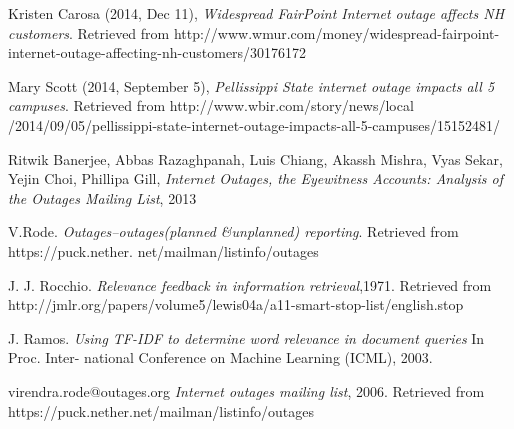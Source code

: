 \documentclass{sig-alternate}
\begin{document}
\begin{thebibliography}{7}
Kristen Carosa (2014, Dec 11),
  \emph{Widespread FairPoint Internet outage affects NH customers}. Retrieved from http://www.wmur.com/money/widespread-fairpoint-internet-outage-affecting-nh-customers/30176172

Mary Scott (2014, September 5),
  \emph{Pellissippi State internet outage impacts all 5 campuses}.
Retrieved from http://www.wbir.com/story/news/local
\newline /2014/09/05/pellissippi-state-internet-outage-impacts-all-5-campuses/15152481/
  
Ritwik Banerjee, Abbas Razaghpanah, Luis Chiang, Akassh Mishra, Vyas Sekar, Yejin Choi, Phillipa Gill,
  \emph{Internet Outages, the Eyewitness Accounts: Analysis of the Outages Mailing List}, 2013
  
V.Rode.
\emph{Outages–outages(planned &unplanned) reporting}. 
Retrieved from https://puck.nether. net/mailman/listinfo/outages

  J. J. Rocchio.
  \emph{Relevance feedback in information retrieval},1971. Retrieved from http://jmlr.org/papers/volume5/lewis04a/a11-smart-stop-list/english.stop

  J. Ramos.
  \emph{Using TF-IDF to determine word relevance in document queries} In Proc. Inter- national Conference on Machine Learning (ICML), 2003.
  
  virendra.rode@outages.org
  \emph{Internet outages mailing list}, 2006. Retrieved from
https://puck.nether.net/mailman/listinfo/outages

\end{thebibliography}
\end{document}

